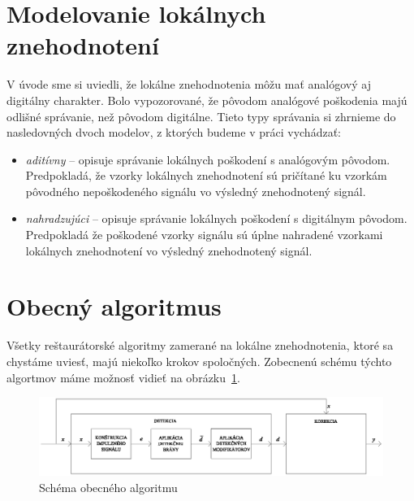 \section{Modelovanie lokálnych znehodnotení}
V úvode sme si uviedli, že lokálne znehodnotenia môžu mať analógový aj digitálny charakter. Bolo vypozorované, že pôvodom analógové poškodenia majú odlišné správanie, než pôvodom digitálne. Tieto typy správania si zhrnieme do nasledovných dvoch modelov, z ktorých budeme v práci vychádzať:
\begin{itemize}
	\item \textit{aditívny} -- opisuje správanie lokálnych poškodení s analógovým pôvodom. Predpokladá, že vzorky lokálnych znehodnotení sú pričítané ku vzorkám pôvodného nepoškodeného signálu vo výsledný znehodnotený signál.
	\item \textit{nahradzujúci} -- opisuje správanie lokálnych poškodení s digitálnym pôvodom. Predpokladá že poškodené vzorky signálu sú úplne nahradené vzorkami lokálnych znehodnotení vo  výsledný znehodnotený signál.
\end{itemize}

\section{Obecný algoritmus}
Všetky reštaurátorské algoritmy zamerané na lokálne znehodnotenia, ktoré sa chystáme uviesť, majú niekoľko krokov spoločných. Zobecnenú schému týchto algortmov máme možnosť vidieť na obrázku~\ref{obrazok:obecny-algoritmus}.

\begin{figure}[!h]
	\centering
	\includegraphics[width=1.0\textwidth]{images/obecny.eps}
	\caption{Schéma obecného algoritmu}
	\label{obrazok:obecny-algoritmus}
\end{figure}

